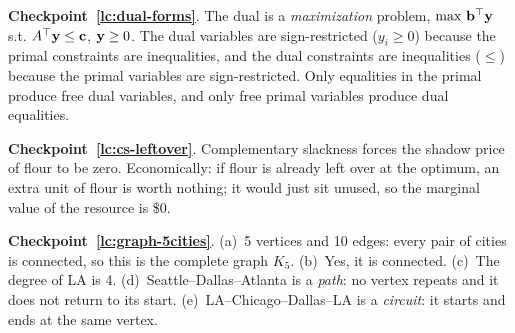 \medskip

\noindent\textbf{Checkpoint~\ref{lc:dual-forms}}.
The dual is a \emph{maximization} problem, $\max\, \mathbf{b}^\top \mathbf{y}$ s.t. $A^\top \mathbf{y} \leq \mathbf{c}$, $\mathbf{y} \geq 0$. The dual variables are sign-restricted ($y_i \geq 0$) because the primal constraints are inequalities, and the dual constraints are inequalities ($\leq$) because the primal variables are sign-restricted. Only equalities in the primal produce free dual variables, and only free primal variables produce dual equalities.

\medskip

\noindent\textbf{Checkpoint~\ref{lc:cs-leftover}}.
Complementary slackness forces the shadow price of flour to be zero. Economically: if flour is already left over at the optimum, an extra unit of flour is worth nothing; it would just sit unused, so the marginal value of the resource is \$0.

\medskip

\noindent\textbf{Checkpoint~\ref{lc:graph-5cities}}.
(a)~5 vertices and 10 edges: every pair of cities is connected, so this is the complete graph $K_5$.
(b)~Yes, it is connected.
(c)~The degree of LA is 4.
(d)~Seattle--Dallas--Atlanta is a \emph{path}: no vertex repeats and it does not return to its start.
(e)~LA--Chicago--Dallas--LA is a \emph{circuit}: it starts and ends at the same vertex.
